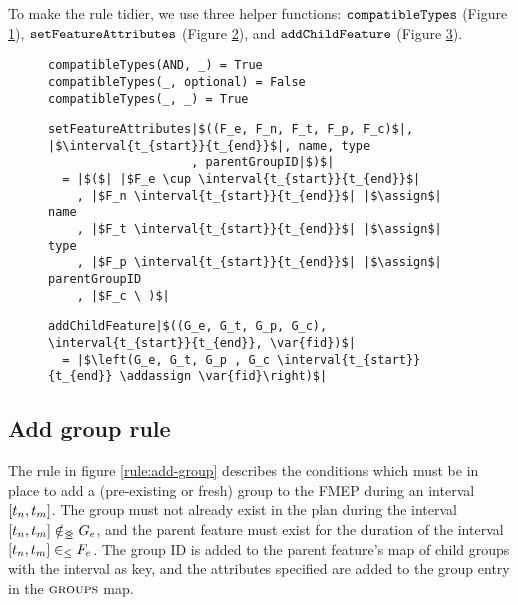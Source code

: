 To make the rule tidier, we use three helper functions: $\texttt{compatibleTypes}$ (Figure \ref{fun:compatible-types}), $\texttt{setFeatureAttributes}$ (Figure \ref{fun:set-feature-attributes}), and $\texttt{addChildFeature}$ (Figure \ref{fun:add-child-feature}). 

\begin{figure}
  \begin{verbatim}
compatibleTypes(AND, _) = True
compatibleTypes(_, optional) = False
compatibleTypes(_, _) = True
  \end{verbatim}
  \caption{\label{fun:compatible-types}}
\end{figure}

\begin{figure}
  \begin{verbatim}
setFeatureAttributes|$((F_e, F_n, F_t, F_p, F_c)$|, |$\interval{t_{start}}{t_{end}}$|, name, type
                    , parentGroupID|$)$|
  = |$($| |$F_e \cup \interval{t_{start}}{t_{end}}$|
    , |$F_n \interval{t_{start}}{t_{end}}$| |$\assign$| name
    , |$F_t \interval{t_{start}}{t_{end}}$| |$\assign$| type
    , |$F_p \interval{t_{start}}{t_{end}}$| |$\assign$| parentGroupID
    , |$F_c \ )$|
     \end{verbatim}
  \caption{\label{fun:set-feature-attributes}}
\end{figure}

\begin{figure}
  \begin{verbatim}
addChildFeature|$((G_e, G_t, G_p, G_c), \interval{t_{start}}{t_{end}}, \var{fid})$|
  = |$\left(G_e, G_t, G_p , G_c \interval{t_{start}}{t_{end}} \addassign \var{fid}\right)$|
  \end{verbatim}
  \caption{\label{fun:add-child-feature}}
\end{figure}

\subsection{Add group rule}
\label{sub:add-group-rule}
The rule in figure \ref{rule:add-group} describes the conditions which must be in place to add a (pre-existing or fresh) group to the FMEP during an interval $\interval{t_n}{t_m}$. The group must not already exist in the plan during the interval $\interval{t_n}{t_m} \notinnr G_e$, and the parent feature must exist for the duration of the interval $\interval{t_n}{t_m} \inn F_e$. The group ID is added to the parent feature's map of child groups with the interval as key, and the attributes specified are added to the group entry in the $\textsc{groups}{}$ map.

